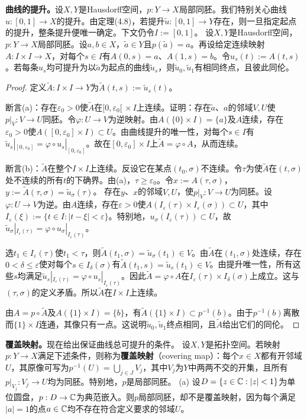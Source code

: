 \textbf{曲线的提升。}设$X,Y$是Hausdorff空间，$p:Y\to X$局部同胚。我们特别关心曲线$u:[0,1]\to X$的提升。由定理(4.8)，若提升$\widetilde u:[0,1]\to Y$存在，则一旦指定起点的提升，整条提升便唯一确定。下文仍令$I:=[0,1]$。
设$X,Y$是Hausdorff空间，$p:Y\to X$局部同胚。设$a,b\in X$，$\widetilde a\in Y$且$p(\widetilde a)=a$。再设给定连续映射$A:I\times I\to X$，对每个$s\in I$有$A(0,s)=a$、$A(1,s)=b$。令$u_s(t):=A(t,s)$。若每条$u_s$均可提升为以$\widetilde a$为起点的曲线$\widetilde u_s$，则$\widetilde u_0,\widetilde u_1$有相同终点，且彼此同伦。
\begin{proof}
定义$\widetilde A:I\times I\to Y$为$\widetilde A(t,s):=\widetilde u_s(t)$。

断言(a)：存在$\varepsilon_0>0$使$\widetilde A$在$[0,\varepsilon_0[\,\times I$上连续。证明：存在$\widetilde a$、$a$的邻域$V,U$使$p|_V:V\to U$同胚。令$\varphi:U\to V$为逆映射。由$A(\{0\}\times I)=\{a\}$及$A$连续，存在$\varepsilon_0>0$使$A([0,\varepsilon_0]\times I)\subset U$。由曲线提升的唯一性，对每个$s\in I$有$\widetilde u_s|_{[0,\varepsilon_0]}=\varphi\circ u_s|_{[0,\varepsilon_0]}$。故在$[0,\varepsilon_0]\times I$上$\widetilde A=\varphi\circ A$，从而连续。

断言(b)：$\widetilde A$在整个$I\times I$上连续。反设它在某点$(t_0,\sigma)$不连续。令$\tau$为使$\widetilde A$在$(t,\sigma)$处不连续的所有$t$的下确界。由(a)，$\tau\ge\varepsilon_0$。令$x:=A(\tau,\sigma)$，$y:=\widetilde A(\tau,\sigma)=\widetilde u_\sigma(\tau)$。
存在$y$、$x$的邻域$V,U$，使$p|_V:V\to U$为同胚。设$\varphi:U\to V$为逆。由$A$连续，存在$\varepsilon>0$使$A(I_\varepsilon(\tau)\times I_\varepsilon(\sigma))\subset U$，其中$I_\varepsilon(\xi):=\{t\in I:|t-\xi|<\varepsilon\}$。特别地，$u_\sigma(I_\varepsilon(\tau))\subset U$，故$\widetilde u_\sigma|_{I_\varepsilon(\tau)}=\varphi\circ u_\sigma|_{I_\varepsilon(\tau)}$。

选$t_1\in I_\varepsilon(\tau)$使$t_1<\tau$，则$\widetilde A(t_1,\sigma)=\widetilde u_\sigma(t_1)\in V$。由$\widetilde A$在$(t_1,\sigma)$处连续，存在$0<\delta\le\varepsilon$使对每个$s\in I_\delta(\sigma)$有$\widetilde A(t_1,s)=\widetilde u_s(t_1)\in V$。由提升唯一性，所有这些$s$均满足$\widetilde u_s|_{I_\varepsilon(\tau)}=\varphi\circ u_s|_{I_\varepsilon(\tau)}$。因此$\widetilde A=\varphi\circ A$在$I_\varepsilon(\tau)\times I_\delta(\sigma)$上成立。这与$(\tau,\sigma)$的定义矛盾。所以$\widetilde A$在$I\times I$上连续。

由$A=p\circ\widetilde A$及$A(\{1\}\times I)=\{b\}$，有$\widetilde A(\{1\}\times I)\subset p^{-1}(b)$。由于$p^{-1}(b)$离散而$\{1\}\times I$连通，其像只有一点。这说明$\widetilde u_0,\widetilde u_1$终点相同，且$\widetilde A$给出它们的同伦。
\end{proof}
\textbf{覆盖映射。}现在给出保证曲线总可提升的条件。
设$X,Y$是拓扑空间。若映射$p:Y\to X$满足下述条件，则称为\textbf{覆盖映射}（covering map）：每个$x\in X$都有开邻域$U$，其原像可写为$p^{-1}(U)=\bigcup_{j\in J}V_j$，其中$V_j$为$Y$中两两不交的开集，且所有$p|_{V_j}:V_j\to U$均为同胚。特别地，$p$是局部同胚。
(a) 设$D=\{z\in\mathbb C:|z|<1\}$为单位圆盘，$p:D\to\mathbb C$为典范嵌入。则$p$局部同胚，却不是覆盖映射，因为每个满足$|a|=1$的点$a\in\mathbb C$均不存在符合定义要求的邻域$U$。

